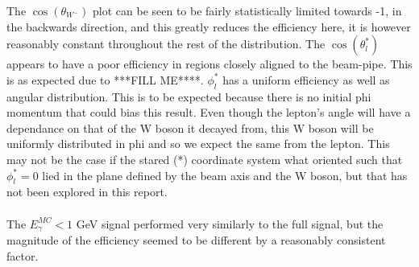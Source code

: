 The $\cos{({\theta}_{{W}^{-}})}$ plot can be seen to be fairly statistically limited towards -1, in the backwards direction, and this greatly reduces the efficiency here, it is however reasonably constant throughout the rest of the distribution. The $\cos{({\theta}_{l}^{*})}$ appears to have a poor efficiency in regions closely aligned to the beam-pipe. This is as expected due to ***FILL ME****. ${\phi}_{l}^{*}$ has a uniform efficiency as well as angular distribution. This is to be expected because there is no initial phi momentum that could bias this result. Even though the lepton's angle will have a dependance on that of the W boson it decayed from, this W boson will be uniformly distributed in phi and so we expect the same from the lepton. This  may not be the case if the stared (*) coordinate system what oriented such that ${\phi}_{l}^{*} = 0$ lied in the plane defined by the beam axis and the W boson, but that has not been explored in this report.
\\\\
The ${E}_{\gamma}^{MC} < 1$ GeV signal performed very similarly to the full signal, but the magnitude of the efficiency seemed to be different by a reasonably consistent factor.
